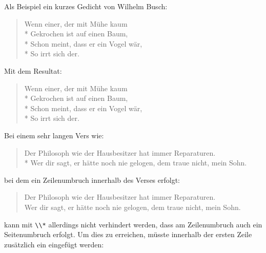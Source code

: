     \begin{Example}
      Als Beispiel ein kurzes Gedicht von Wilhelm Busch:
\begin{lstcode}
  \begin{verse}
    Wenn einer, der mit Mühe kaum\\*
    Gekrochen ist auf einen Baum,\\*
    Schon meint, dass er ein Vogel wär,\\*
    So irrt sich der.
  \end{verse}
\end{lstcode}
      Mit dem Resultat:
      \begin{ShowOutput}
        \begin{verse}
          Wenn einer, der mit Mühe kaum\\*
          Gekrochen ist auf einen Baum,\\*
          Schon meint, dass er ein Vogel wär,\\*
          So irrt sich der.
        \end{verse}
      \end{ShowOutput}
      Bei einem sehr langen Vers wie:
\begin{lstcode}
  \begin{verse}
    Der Philosoph wie der Hausbesitzer hat 
    immer Reparaturen.\\* 
    \bigskip
    Wer dir sagt, er hätte noch nie gelogen, 
    dem traue nicht, mein Sohn.
  \end{verse}
\end{lstcode}
      bei dem ein Zeilenumbruch innerhalb des Verses erfolgt:
      \begin{ShowOutput}
        \begin{verse}
          Der Philosoph wie der Hausbesitzer hat immer Reparaturen.\\
          \bigskip
          Wer dir sagt, er hätte noch nie gelogen, dem traue nicht, mein
          Sohn.
        \end{verse}
      \end{ShowOutput}
      kann mit \verb|\\*| allerdings nicht verhindert werden, dass am
      Zeilenumbruch auch ein Seitenumbruch erfolgt. Um dies zu erreichen,
      müsste innerhalb der ersten Zeile zusätzlich ein
       eingefügt werden:

\end{Example}
